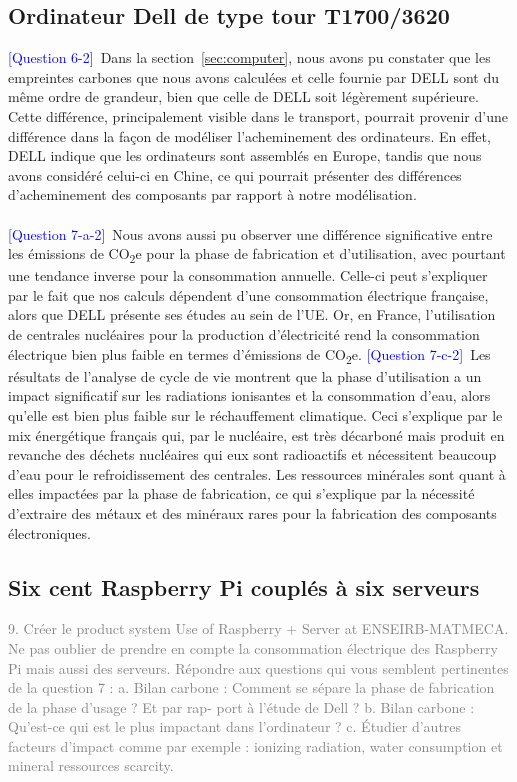 \documentclass[12pt,a4paper]{paper}
\begin{document}
\subsection{Ordinateur Dell de type tour T1700/3620}
\textcolor{blue}{[Question 6-2]}~Dans la section~\ref{sec:computer}, nous avons pu constater que les empreintes carbones que nous avons calculées et celle fournie par DELL sont du même ordre de grandeur, bien que celle de DELL soit légèrement supérieure. Cette différence, principalement visible dans le transport, pourrait provenir d'une différence dans la façon de modéliser l'acheminement des ordinateurs. En effet, DELL indique que les ordinateurs sont assemblés en Europe, tandis que nous avons considéré celui-ci en Chine, ce qui pourrait présenter des différences d'acheminement des composants par rapport à notre modélisation.\\ \\
\textcolor{blue}{[Question 7-a-2]}~Nous avons aussi pu observer une différence significative entre les émissions de CO\textsubscript{2}e pour la phase de fabrication et d'utilisation, avec pourtant une tendance inverse pour la consommation annuelle. Celle-ci peut s'expliquer par le fait que nos calculs dépendent d'une consommation électrique française, alors que DELL présente ses études au sein de l'UE. Or, en France, l'utilisation de centrales nucléaires pour la production d'électricité rend la consommation électrique bien plus faible en termes d'émissions de CO\textsubscript{2}e.
\textcolor{blue}{[Question 7-c-2]}~Les résultats de l'analyse de cycle de vie montrent que la phase d'utilisation a un impact significatif sur les radiations ionisantes et la consommation d'eau, alors qu'elle est bien plus faible sur le réchauffement climatique. Ceci s'explique par le mix énergétique français qui, par le nucléaire, est très décarboné mais produit en revanche des déchets nucléaires qui eux sont radioactifs et nécessitent beaucoup d'eau pour le refroidissement des centrales.
Les ressources minérales sont quant à elles impactées par la phase de fabrication, ce qui s'explique par la nécessité d'extraire des métaux et des minéraux rares pour la fabrication des composants électroniques.


\subsection{Six cent Raspberry Pi couplés à six serveurs}

\textcolor{gray}{ 9. Créer le product system Use of Raspberry + Server at ENSEIRB-MATMECA. Ne pas oublier de prendre en compte la consommation électrique des Raspberry Pi mais aussi des serveurs. Répondre aux questions qui vous semblent pertinentes de la question 7 :}
\textcolor{gray}{a. Bilan carbone : Comment se sépare la phase de fabrication de la phase d’usage ? Et par rap-}
\textcolor{gray}{port à l’étude de Dell ?}
\textcolor{gray}{b. Bilan carbone : Qu’est-ce qui est le plus impactant dans l’ordinateur ?}
\textcolor{gray}{c. Étudier d’autres facteurs d’impact comme par exemple : ionizing radiation, water consumption}
\textcolor{gray}{et mineral ressources scarcity.}
\end{document}
